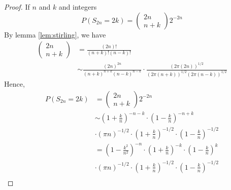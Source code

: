 \begin{proof}
    If $n$ and $k$ and integers
    \begin{equation*}
        P\left(S_{2 n}=2 k\right)=\left(\begin{array}{c}
                2 n \\
                n+k
            \end{array}\right) 2^{-2 n}
    \end{equation*}
    By lemma \ref{lem:stirling}, we have
    \begin{equation*}
        \begin{aligned}
            \left(\begin{array}{c}
                    2 n \\
                    n+k
                \end{array}\right) & =\frac{(2 n) !}{(n+k) !(n-k) !}                                                                                             \\
                                                   & \sim \frac{(2 n)^{2 n}}{(n+k)^{n+k}(n-k)^{n-k}} \cdot \frac{(2 \pi(2 n))^{1 / 2}}{(2 \pi(n+k))^{1 / 2}(2 \pi(n-k))^{1 / 2}}
        \end{aligned}
    \end{equation*}
    Hence,
    \begin{equation*}
        \begin{aligned}
            P\left(S_{2 n}=2 k\right) & =
            \left(\begin{array}{c}
                    2 n \\
                    n+k
                \end{array}\right) 2^{-2 n}                                                                                               \\
                                      & \sim\left(1+\frac{k}{n}\right)^{-n-k} \cdot\left(1-\frac{k}{n}\right)^{-n+k}                                      \\
                                      & \cdot(\pi n)^{-1 / 2} \cdot\left(1+\frac{k}{n}\right)^{-1 / 2} \cdot\left(1-\frac{k}{n}\right)^{-1 / 2}           \\
                                      & =\left(1-\frac{k^{2}}{n^{2}}\right)^{-n} \cdot\left(1+\frac{k}{n}\right)^{-k} \cdot\left(1-\frac{k}{n}\right)^{k} \\
                                      & \cdot(\pi n)^{-1 / 2} \cdot\left(1+\frac{k}{n}\right)^{-1 / 2} \cdot\left(1-\frac{k}{n}\right)^{-1 / 2}           \\

\end{aligned}
\end{equation*}
\end{proof}
